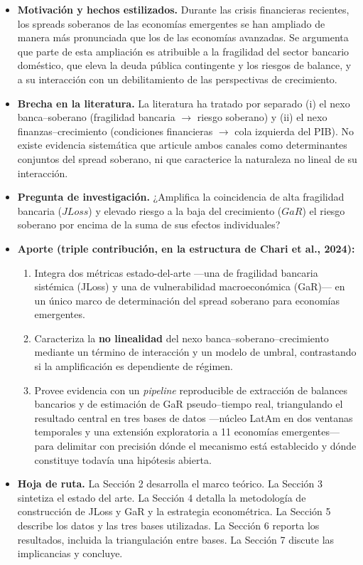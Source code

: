 \documentclass[5p,times,twocolumn,authoryear]{elsarticle}
\begin{document}
\begin{itemize}
    \item \textbf{Motivación y hechos estilizados.} Durante las crisis financieras recientes, los spreads soberanos de las economías emergentes se han ampliado de manera más pronunciada que los de las economías avanzadas. Se argumenta que parte de esta ampliación es atribuible a la fragilidad del sector bancario doméstico, que eleva la deuda pública contingente y los riesgos de balance, y a su interacción con un debilitamiento de las perspectivas de crecimiento.
    \item \textbf{Brecha en la literatura.} La literatura ha tratado por separado (i) el nexo banca–soberano (fragilidad bancaria $\rightarrow$ riesgo soberano) y (ii) el nexo finanzas–crecimiento (condiciones financieras $\rightarrow$ cola izquierda del PIB). No existe evidencia sistemática que articule ambos canales como determinantes conjuntos del spread soberano, ni que caracterice la naturaleza no lineal de su interacción.
    \item \textbf{Pregunta de investigación.} ¿Amplifica la coincidencia de alta fragilidad bancaria ($JLoss$) y elevado riesgo a la baja del crecimiento ($GaR$) el riesgo soberano por encima de la suma de sus efectos individuales?
    \item \textbf{Aporte (triple contribución, en la estructura de Chari et al., 2024):}
    \begin{enumerate}
        \item Integra dos métricas estado-del-arte —una de fragilidad bancaria sistémica (JLoss) y una de vulnerabilidad macroeconómica (GaR)— en un único marco de determinación del spread soberano para economías emergentes.
        \item Caracteriza la \textbf{no linealidad} del nexo banca–soberano–crecimiento mediante un término de interacción y un modelo de umbral, contrastando si la amplificación es dependiente de régimen.
        \item Provee evidencia con un \textit{pipeline} reproducible de extracción de balances bancarios y de estimación de GaR pseudo–tiempo real, triangulando el resultado central en tres bases de datos —núcleo LatAm en dos ventanas temporales y una extensión exploratoria a 11 economías emergentes— para delimitar con precisión dónde el mecanismo está establecido y dónde constituye todavía una hipótesis abierta.
    \end{enumerate}
    \item \textbf{Hoja de ruta.} La Sección 2 desarrolla el marco teórico. La Sección 3 sintetiza el estado del arte. La Sección 4 detalla la metodología de construcción de JLoss y GaR y la estrategia econométrica. La Sección 5 describe los datos y las tres bases utilizadas. La Sección 6 reporta los resultados, incluida la triangulación entre bases. La Sección 7 discute las implicancias y concluye.
\end{itemize}
\end{document}

